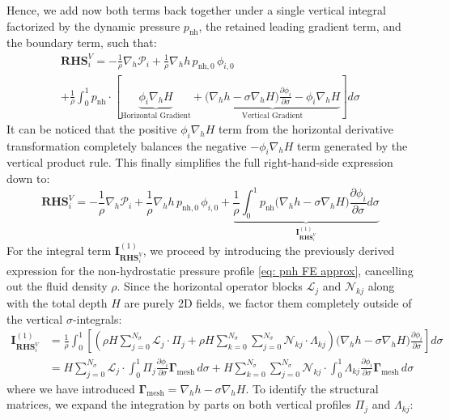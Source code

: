 \documentclass{article}
\newcommand{\Ns}{N_\sigma}
\newcommand{\sumj}{\sum_{j=0}^{\Ns}}
\newcommand{\sumk}{\sum_{k=0}^{\Ns}}
\newcommand{\nablah}{\nabla_h}
\newcommand{\pnh}{p_{\text{nh}}}
\newcommand{\pnhbottom}{p_{\text{nh},0}}
\newcommand{\Gam}{\boldsymbol{\Gamma}_{\text{mesh}}}
\newcommand{\Pcol}{\mathcal{P}_i}
\begin{document}
\begin{itemize}
    Hence, we add now both terms back together under a single vertical integral factorized by the dynamic pressure $\pnh$, the retained leading gradient term, and the boundary term, such that:
    \begin{multline*}
        \mathbf{RHS}_i^V = -\frac{1}{\rho}\nablah\Pcol + \frac{1}{\rho}\nablah h \,\pnhbottom \,\phi_{i,0} \\[1mm]
        + \frac{1}{\rho} \int_0^1 \pnh \cdot \left[ \underbrace{\phi_i \nablah H}_{\text{Horizontal Gradient}} + \underbrace{\Big(\nablah h - \sigma \nablah H\Big) \frac{\partial \phi_i}{\partial \sigma} - \phi_i \nablah H}_{\text{Vertical Gradient}} \right] d\sigma
    \end{multline*}
    It can be noticed that the positive $\phi_i \nablah H$ term from the horizontal derivative transformation completely balances the negative $-\phi_i \nablah H$ term generated by the vertical product rule.
    This finally simplifies the full right-hand-side expression down to:
    $$\mathbf{RHS}_i^V = -\frac{1}{\rho}\nablah\Pcol + \frac{1}{\rho}\nablah h \,\pnhbottom \,\phi_{i,0}+ \underbrace{\frac{1}{\rho} \int_0^1 \pnh\Big(\nablah h - \sigma \nablah H\Big) \frac{\partial \phi_i}{\partial \sigma} d\sigma}_{\mathbf{I}_{\mathbf{RHS}_i^V}^{(1)}}$$
    For the integral term $\mathbf{I}_{\mathbf{RHS}_i^V}^{(1)}$, we proceed by introducing the previously derived expression for the non-hydrostatic pressure profile \eqref{eq: pnh FE approx}, cancelling out the fluid density $\rho$.
    Since the horizontal operator blocks $\mathcal{L}_j$ and $\mathcal{N}_{kj}$ along with the total depth $H$ are purely 2D fields, we factor them completely outside of the vertical $\sigma$-integrals:
    \begin{align*}
        \mathbf{I}_{\mathbf{RHS}_i^V}^{(1)} &=  \frac{1}{\rho} \int_0^1 \left[\left(\rho H \sumj \mathcal{L}_j\cdot\Pi_j + \rho H \sumk \sumj
        \mathcal{N}_{kj}\cdot\Lambda_{kj}\right)  \Big(\nablah h - \sigma \nablah H\Big) \frac{\partial \phi_i}{\partial \sigma} \right]d\sigma\\
        &= H \sumj \mathcal{L}_j \cdot \int_0^1 \Pi_j \frac{\partial \phi_i}{\partial \sigma} \Gam \, d\sigma +H \sumk \sumj \mathcal{N}_{kj} \cdot \int_0^1 \Lambda_{kj} \frac{\partial \phi_i}{\partial \sigma} \Gam\, d\sigma
    \end{align*}
    where we have introduced $\Gam=\nablah h - \sigma \nablah H$. 
    To identify the structural matrices, we expand the integration by parts on both vertical profiles $\Pi_j$ and $\Lambda_{kj}$:
    \begin{align*}

\end{align*}
\end{itemize}
\end{document}

